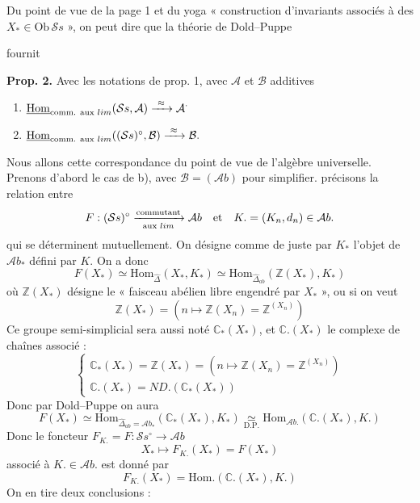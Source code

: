 \documentclass[11pt,a4paper]{article}
\begin{document}
Du point de vue de la page 1 et du yoga \struck{\ill{}} \ill{} « construction
d'invariants associés à des $X_{*} \in \mathrm{Ob}\,\mathcal{S}s$ », on peut dire que
la théorie de Dold--Puppe

fournit
\struck{\ill{}}

\textbf{Prop. 2.} Avec les notations  de prop. 1, avec $\mathcal{A}$
et $\mathcal{B}$ additives \struck{\ill{}}
\begin{enumerate}
  \item[a)] $\underline{\mathrm{Hom}}_{\text{comm. aux } \varinjlim}(\mathcal{S}s, \mathcal{A}) \xrightarrow{\ \approx\ } \mathcal{A}^{\cdot}$
  \item[b)] $\underline{\mathrm{Hom}}_{\text{comm. aux } \varinjlim}((\mathcal{S}s)^{\circ}, \mathcal{B}) \xrightarrow{\ \approx\ } \mathcal{B}.$
\end{enumerate}

Nous allons   cette correspondance du point de vue
de l'algèbre universelle. Prenons d'abord le cas de b), avec $\mathcal{B} = (\mathcal{A}b)$
pour simplifier. \struck{\ill{}} 
précisons la relation entre
\[
  F : (\mathcal{S}s)^{\circ} \xrightarrow[\text{aux } \varinjlim]{\text{commutant}} \mathcal{A}b
  \quad \text{et} \quad K. = (K_{n}, d_{n}) \in \mathcal{A}b.
\]
qui se déterminent mutuellement. On désigne comme de juste par $K_{*}$ l'objet de
$\mathcal{A}b_{*}$ défini par $K.$ On a donc
\[
  F(X_{*}) \simeq \mathrm{Hom}_{\widehat{\Delta}}(X_{*}, K_{*})
  \simeq \mathrm{Hom}_{\widehat{\Delta}_{ab}}(\mathbb{Z}(X_{*}), K_{*})
\]
où $\mathbb{Z}(X_{*})$ désigne le « faisceau abélien libre engendré par $X_{*}$ »,
ou si on veut
\[
  \mathbb{Z}(X_{*}) = (n \longmapsto \mathbb{Z}(X_{n}) = \mathbb{Z}^{(X_{n})})
\]
Ce groupe  semi-simplicial sera aussi noté $\mathbb{C}_{*}(X_{*})$, et
$\mathbb{C}.(X_{*})$ le complexe de chaînes associé  :
\[
  \begin{cases}
    \mathbb{C}_{*}(X_{*}) = \mathbb{Z}(X_{*}) = (n \longmapsto \mathbb{Z}(X_{n}) = \mathbb{Z}^{(X_{n})}) \\
    \mathbb{C}.(X_{*}) = ND.(\mathbb{C}_{*}(X_{*}))
  \end{cases}
\]
Donc par Dold--Puppe on aura
\[
  F(X_{*}) \simeq \mathrm{Hom}_{\widehat{\Delta}_{ab} = \mathcal{A}b_{*}}(\mathbb{C}_{*}(X_{*}), K_{*})
  \underset{\text{D.P.}}{\simeq} \mathrm{Hom}_{\mathcal{A}b.}(\mathbb{C}.(X_{*}), K.)
\]
Donc le foncteur $F_{K.} = F : \mathcal{S}s^{\circ} \longrightarrow \mathcal{A}b$
\[
  X_{*} \longmapsto F_{K.}(X_{*}) = F(X_{*})
\]
associé à $K. \in \mathcal{A}b.$ est donné par
\[
  \boxed{F_{K.}(X_{*}) = \mathrm{Hom}.(\mathbb{C}.(X_{*}), K.)}
\]
On en tire deux conclusions :
\end{document}
